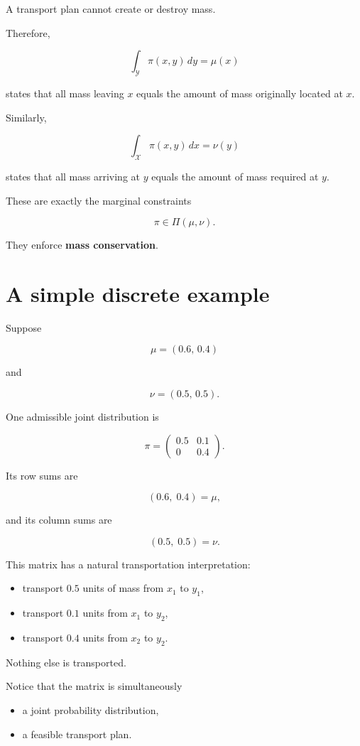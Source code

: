 \begin{appendices}
A transport plan cannot create or destroy mass.

Therefore,

\[
\int_{\mathcal Y}\pi(x,y)\,dy=\mu(x)
\]

states that all mass leaving $x$ equals the amount of mass originally located at $x$.

Similarly,

\[
\int_{\mathcal X}\pi(x,y)\,dx=\nu(y)
\]

states that all mass arriving at $y$ equals the amount of mass required at $y$.

These are exactly the marginal constraints

\[
\pi\in\Pi(\mu,\nu).
\]

They enforce \textbf{mass conservation}.

\section*{A simple discrete example}

Suppose

\[
\mu=(0.6,\,0.4)
\]

and

\[
\nu=(0.5,\,0.5).
\]

One admissible joint distribution is

\[
\pi=
\begin{pmatrix}
0.5 & 0.1\\
0 & 0.4
\end{pmatrix}.
\]

Its row sums are

\[
(0.6,\;0.4)=\mu,
\]

and its column sums are

\[
(0.5,\;0.5)=\nu.
\]

This matrix has a natural transportation interpretation:

\begin{itemize}
    \item transport $0.5$ units of mass from $x_1$ to $y_1$,
    \item transport $0.1$ units from $x_1$ to $y_2$,
    \item transport $0.4$ units from $x_2$ to $y_2$.
\end{itemize}

Nothing else is transported.

Notice that the matrix is simultaneously

\begin{itemize}
    \item a joint probability distribution,
    \item a feasible transport plan.
\end{itemize}


\end{appendices}
